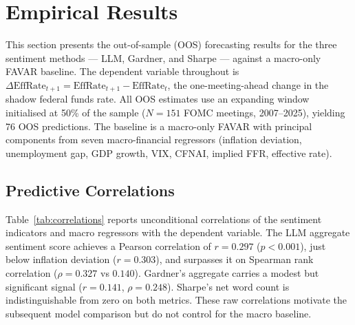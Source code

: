 
\section{Empirical Results}

This section presents the out-of-sample (OOS) forecasting results for the three sentiment methods --- LLM, Gardner, and Sharpe --- against a macro-only FAVAR baseline. The dependent variable throughout is $\Delta\text{EffRate}_{t+1} = \text{EffRate}_{t+1} - \text{EffRate}_t$, the one-meeting-ahead change in the shadow federal funds rate. All OOS estimates use an expanding window initialised at 50\% of the sample ($N=151$ FOMC meetings, 2007--2025), yielding 76 OOS predictions. The baseline is a macro-only FAVAR with principal components from seven macro-financial regressors (inflation deviation, unemployment gap, GDP growth, VIX, CFNAI, implied FFR, effective rate).


\subsection{Predictive Correlations}

Table~\ref{tab:correlations} reports unconditional correlations of the sentiment indicators and macro regressors with the dependent variable. The LLM aggregate sentiment score achieves a Pearson correlation of $r = 0.297$ ($p < 0.001$), just below inflation deviation ($r = 0.303$), and surpasses it on Spearman rank correlation ($\rho = 0.327$ vs $0.140$). Gardner's aggregate carries a modest but significant signal ($r = 0.141$, $\rho = 0.248$). Sharpe's net word count is indistinguishable from zero on both metrics. These raw correlations motivate the subsequent model comparison but do not control for the macro baseline.


